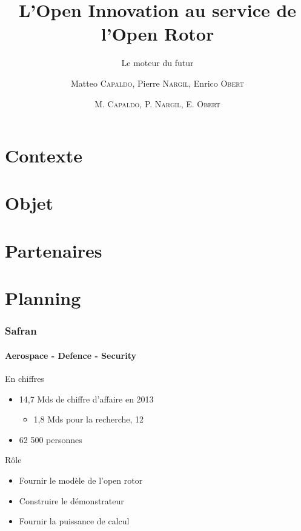 \documentclass[12pt]{beamer}
\title{L'Open Innovation au service de l'Open Rotor}
\subtitle{Le moteur du futur}
\author{Matteo \textsc{Capaldo}, Pierre \textsc{Nargil}, Enrico \textsc{Obert}}
\begin{document}
\frame{\titlepage}
\author{M. \textsc{Capaldo}, P. \textsc{Nargil}, E. \textsc{Obert}}

\frame{\tableofcontents}
\addtocounter{framenumber}{3}
\section{Contexte}
\section{Objet}
\section{Partenaires}
\section{Planning}
\begin{frame}

\frametitle{Safran}
\framesubtitle{Aerospace - Defence - Security}

\begin{block}{En chiffres}
\begin{itemize}
  \item 14,7 Mds de chiffre d'affaire en 2013
  \begin{itemize}
     \item 1,8 Mds pour la recherche, 12%
  \end{itemize}
  \item 62 500 personnes
\end{itemize}
\end{block}
\begin{block}{Rôle}
\begin{itemize}
  \item Fournir le modèle de l'open rotor
  \item Construire le démonstrateur
  \item Fournir la puissance de calcul
\end{itemize}
\end{block}

\end{frame}
\end{document}
